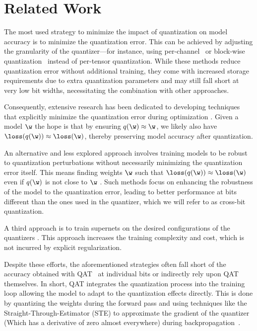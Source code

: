 \section{Related Work}
The most used strategy to minimize the impact of quantization on model accuracy is to minimize the quantization error. This can be achieved by adjusting the granularity of the quantizer—for instance, using per-channel~\cite{Nagel_2019_ICCV} or block-wise quantization~\cite{dettmers2022bit} instead of per-tensor quantization. While these methods reduce quantization error without additional training, they come with increased storage requirements due to extra quantization parameters and may still fall short at very low bit widths, necessitating the combination with other approaches.

Consequently, extensive research has been dedicated to developing techniques that explicitly minimize the quantization error during optimization \cite{BridgeDeepLearning, minimizeQuantError, APTQ, Choi_2020, ImprovingLowBit, zhong2024mbquantnovelmultibranchtopology}. Given a model $\w$ the hope is that by ensuring \( q(\w) \approx \w \), we likely also have \( \loss(q(\w)) \approx \loss(\w) \), thereby preserving model accuracy after quantization.

 
An alternative and less explored approach involves training models to be robust to quantization perturbations without necessarily minimizing the quantization error itself. This means finding weights \( \w \) such that \( \loss(q(\w)) \approx \loss(\w) \) even if \( q(\w) \) is not close to \( \w \) \cite{alizadeh2020gradient, OneModelRobust}. Such methods focus on enhancing the robustness of the model to the quantization error, leading to better performance at bits different than the ones used in the quantizer, which we will refer to as cross-bit quantization.

A third approach is to train supernets on the desired configurations of the quantizers \cite{ijcai2022p504, Xu_2023_ICCV}. This approach increases the training complexity and cost, which is not incurred by explicit regularization. 

Despite these efforts, the aforementioned strategies often fall short of the accuracy obtained with QAT~\cite{jacob2017quantization} at individual bits or indirectly rely upon QAT themselves. In short, QAT integrates the quantization process into the training loop allowing the model to adapt to the quantization effects directly. This is done by quantizing the weights during the forward pass and using techniques like the Straight-Through-Estimator (STE) to approximate the gradient of the quantizer (Which has a derivative of zero almost everywhere) during backpropagation~\cite{bengio2013ste}.

